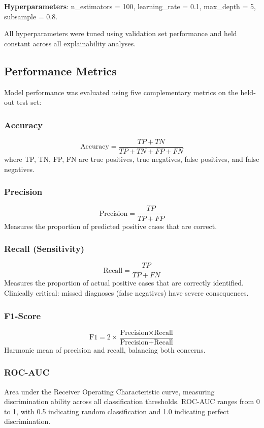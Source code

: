 \documentclass[journal]{IEEEtran}
\begin{document}
\textbf{Hyperparameters}: n\_estimators = 100, learning\_rate = 0.1, max\_depth = 5, subsample = 0.8.

All hyperparameters were tuned using validation set performance and held constant across all explainability analyses.

\subsection{Performance Metrics}

Model performance was evaluated using five complementary metrics on the held-out test set:

\subsubsection{Accuracy}
\[
\text{Accuracy} = \frac{TP + TN}{TP + TN + FP + FN}
\]
where TP, TN, FP, FN are true positives, true negatives, false positives, and false negatives.

\subsubsection{Precision}
\[
\text{Precision} = \frac{TP}{TP + FP}
\]
Measures the proportion of predicted positive cases that are correct.

\subsubsection{Recall (Sensitivity)}
\[
\text{Recall} = \frac{TP}{TP + FN}
\]
Measures the proportion of actual positive cases that are correctly identified. Clinically critical: missed diagnoses (false negatives) have severe consequences.

\subsubsection{F1-Score}
\[
\text{F1} = 2 \times \frac{\text{Precision} \times \text{Recall}}{\text{Precision} + \text{Recall}}
\]
Harmonic mean of precision and recall, balancing both concerns.

\subsubsection{ROC-AUC}
Area under the Receiver Operating Characteristic curve, measuring discrimination ability across all classification thresholds. ROC-AUC ranges from 0 to 1, with 0.5 indicating random classification and 1.0 indicating perfect discrimination.
\end{document}
